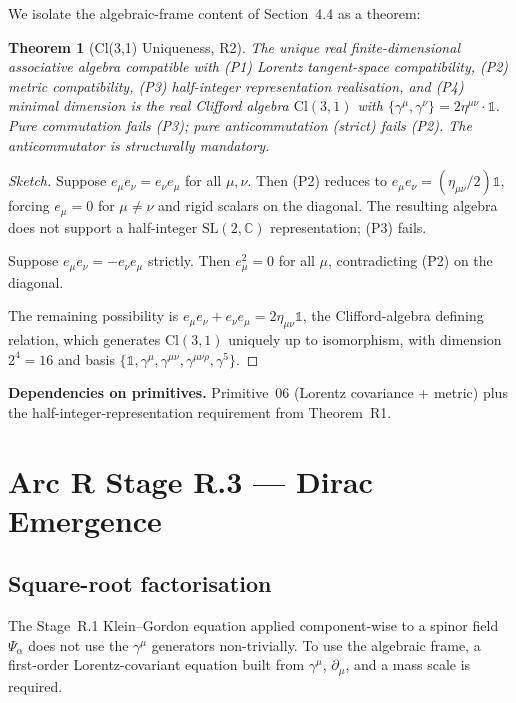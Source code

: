 \documentclass[11pt,a4paper]{article}
\newtheorem{theorem}{Theorem}[section]
\begin{document}
We isolate the algebraic-frame content of Section~4.4 as a theorem:

\begin{theorem}[Cl(3,1) Uniqueness, R2]
The unique real finite-dimensional associative algebra compatible with (P1) Lorentz tangent-space compatibility, (P2) metric compatibility, (P3) half-integer representation realisation, and (P4) minimal dimension is the real Clifford algebra $\mathrm{Cl}(3,1)$ with $\{\gamma^\mu, \gamma^\nu\} = 2\eta^{\mu\nu} \cdot \mathbb{1}$. Pure commutation fails (P3); pure anticommutation (strict) fails (P2). The anticommutator is structurally mandatory.
\end{theorem}

\begin{proof}[Sketch]
Suppose $e_\mu e_\nu = e_\nu e_\mu$ for all $\mu, \nu$. Then (P2) reduces to $e_\mu e_\nu = (\eta_{\mu\nu}/2)\mathbb{1}$, forcing $e_\mu = 0$ for $\mu \ne \nu$ and rigid scalars on the diagonal. The resulting algebra does not support a half-integer $\mathrm{SL}(2,\mathbb{C})$ representation; (P3) fails.

Suppose $e_\mu e_\nu = -e_\nu e_\mu$ strictly. Then $e_\mu^2 = 0$ for all $\mu$, contradicting (P2) on the diagonal.

The remaining possibility is $e_\mu e_\nu + e_\nu e_\mu = 2\eta_{\mu\nu}\mathbb{1}$, the Clifford-algebra defining relation, which generates $\mathrm{Cl}(3,1)$ uniquely up to isomorphism, with dimension $2^4 = 16$ and basis $\{\mathbb{1}, \gamma^\mu, \gamma^{\mu\nu}, \gamma^{\mu\nu\rho}, \gamma^5\}$.
\end{proof}

\textbf{Dependencies on primitives.} Primitive~06 (Lorentz covariance + metric) plus the half-integer-representation requirement from Theorem~R1.

\section{Arc R Stage R.3 --- Dirac Emergence}
\label{sec:r3}

\subsection{Square-root factorisation}

The Stage~R.1 Klein--Gordon equation applied component-wise to a spinor field $\Psi_\alpha$ does not use the $\gamma^\mu$ generators non-trivially. To use the algebraic frame, a first-order Lorentz-covariant equation built from $\gamma^\mu$, $\partial_\mu$, and a mass scale is required.
\end{document}

